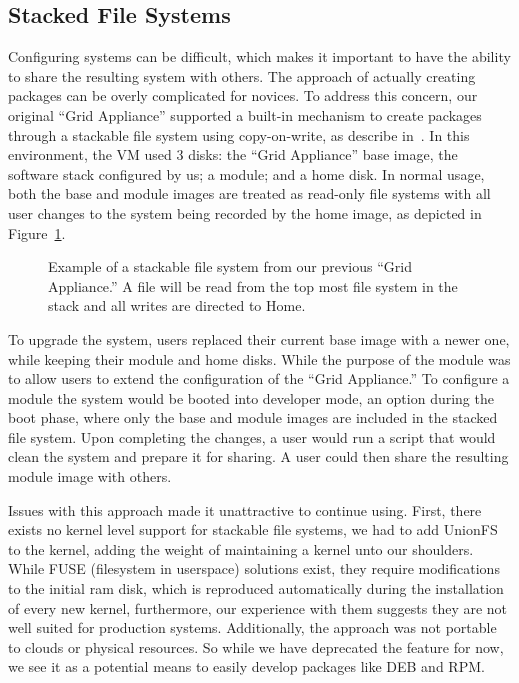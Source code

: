 \documentclass[twocolumn]{svjour3}
\begin{document}
\subsection{Stacked File Systems}

Configuring systems can be difficult, which makes it important to have the
ability to share the resulting system with others.  The approach of actually
creating packages can be overly complicated for novices.  To address this
concern, our original ``Grid Appliance'' supported a built-in mechanism to
create packages through a stackable file system using copy-on-write, as
describe in~\cite{vtdc}.  In this environment, the VM used 3 disks: the ``Grid
Appliance'' base image, the software stack configured by us; a module; and a
home disk.  In normal usage, both the base and module images are treated as
read-only file systems with all user changes to the system being recorded by
the home image, as depicted in Figure~\ref{fig:stackfs}.

\begin{figure}[ht]
\centering
{}
\caption{Example of a stackable file system from our previous ``Grid
Appliance.''  A file will be read from the top most file system in the stack
and all writes are directed to Home.}
\label{fig:stackfs}
\end{figure}

To upgrade the system, users replaced their current base image with a newer
one, while keeping their module and home disks.  While the purpose of the
module was to allow users to extend the configuration of the ``Grid
Appliance.''  To configure a module the system would be booted into developer
mode, an option during the boot phase, where only the base and module images
are included in the stacked file system.  Upon completing the changes, a user
would run a script that would clean the system and prepare it for sharing.  A
user could then share the resulting module image with others.

Issues with this approach made it unattractive to continue using.  First, there
exists no kernel level support for stackable file systems, we had to add
UnionFS~\cite{unionfs} to the kernel, adding the weight of maintaining a kernel
unto our shoulders.  While FUSE (filesystem in userspace) solutions exist, they
require modifications to the initial ram disk, which is reproduced
automatically during the installation of every new kernel, furthermore, our
experience with them suggests they are not well suited for production systems.
Additionally, the approach was not portable to clouds or physical resources.
So while we have deprecated the feature for now, we see it as a potential means
to easily develop packages like DEB and RPM.
\end{document}
